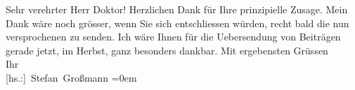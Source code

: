            \pstart\center{}Sehr verehrter Herr Doktor!\pend\pstart
           Herzlichen Dank für Ihre prinzipielle Zusage. Mein Dank wäre noch grösser, wenn Sie
               sich entschliessen würden, recht bald die nun versprochenen \label{K_L02451_1v}\label{K_L02451_1h} zu
               senden. Ich wäre Ihnen für die Uebersendung von Beiträgen gerade jetzt, im Herbst,
               ganz besonders dankbar.\pend
           \pstart
           Mit ergebensten Grüssen{\\[\baselineskip]}Ihr{\\[\baselineskip]}\spacefill\mbox{{[}hs.:{]} Stefan Großmann}\pend
           \leftskip=0em{}\endnumbering{}  
      